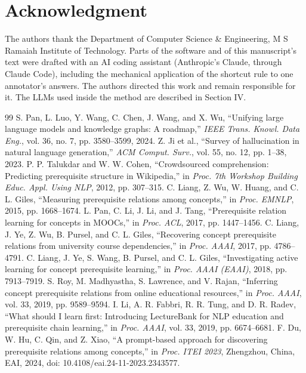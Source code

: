 \documentclass[conference]{IEEEtran}
\begin{document}
\section*{Acknowledgment}
The authors thank the Department of Computer Science \& Engineering, M S Ramaiah Institute of Technology. Parts of the software and of this manuscript's text were drafted with an AI coding assistant (Anthropic's Claude, through Claude Code), including the mechanical application of the shortcut rule to one annotator's answers. The authors directed this work and remain responsible for it. The LLMs used inside the method are described in Section IV.
\begin{thebibliography}{99}
 S. Pan, L. Luo, Y. Wang, C. Chen, J. Wang, and X. Wu, ``Unifying large language models and knowledge graphs: A roadmap,'' \emph{IEEE Trans. Knowl. Data Eng.}, vol. 36, no. 7, pp. 3580--3599, 2024.
 Z. Ji et al., ``Survey of hallucination in natural language generation,'' \emph{ACM Comput. Surv.}, vol. 55, no. 12, pp. 1--38, 2023.
 P. P. Talukdar and W. W. Cohen, ``Crowdsourced comprehension: Predicting prerequisite structure in Wikipedia,'' in \emph{Proc. 7th Workshop Building Educ. Appl. Using NLP}, 2012, pp. 307--315.
 C. Liang, Z. Wu, W. Huang, and C. L. Giles, ``Measuring prerequisite relations among concepts,'' in \emph{Proc. EMNLP}, 2015, pp. 1668--1674.
 L. Pan, C. Li, J. Li, and J. Tang, ``Prerequisite relation learning for concepts in MOOCs,'' in \emph{Proc. ACL}, 2017, pp. 1447--1456.
 C. Liang, J. Ye, Z. Wu, B. Pursel, and C. L. Giles, ``Recovering concept prerequisite relations from university course dependencies,'' in \emph{Proc. AAAI}, 2017, pp. 4786--4791.
 C. Liang, J. Ye, S. Wang, B. Pursel, and C. L. Giles, ``Investigating active learning for concept prerequisite learning,'' in \emph{Proc. AAAI (EAAI)}, 2018, pp. 7913--7919.
 S. Roy, M. Madhyastha, S. Lawrence, and V. Rajan, ``Inferring concept prerequisite relations from online educational resources,'' in \emph{Proc. AAAI}, vol. 33, 2019, pp. 9589--9594.
 I. Li, A. R. Fabbri, R. R. Tung, and D. R. Radev, ``What should I learn first: Introducing LectureBank for NLP education and prerequisite chain learning,'' in \emph{Proc. AAAI}, vol. 33, 2019, pp. 6674--6681.
 F. Du, W. Hu, C. Qin, and Z. Xiao, ``A prompt-based approach for discovering prerequisite relations among concepts,'' in \emph{Proc. ITEI 2023}, Zhengzhou, China, EAI, 2024, doi: 10.4108/eai.24-11-2023.2343577.

\end{thebibliography}
\end{document}
